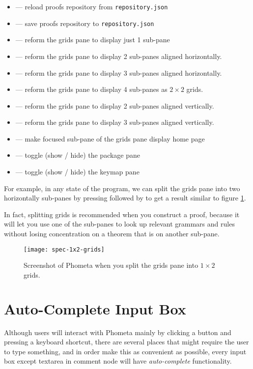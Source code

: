 \documentclass[master.tex]{subfiles}
\begin{document}
\begin{itemize}
\item {} --- reload proofs repository from \texttt{repository.json}
\item {} --- save proofs repository to \texttt{repository.json}
\item {} --- reform the grids pane to display just 1 sub-pane
\item {} --- reform the grids pane to display 2 sub-panes aligned
  horizontally.
\item {} --- reform the grids pane to display 3 sub-panes aligned
  horizontally.
\item {} --- reform the grids pane to display 4 sub-panes as $2 \times 2$
  grids.
\item {} --- reform the grids pane to display 2 sub-panes aligned
  vertically.
\item {} --- reform the grids pane to display 3 sub-panes aligned
  vertically.
\item {} --- make focused sub-pane of the grids pane display home page
\item {} --- toggle (show / hide) the package pane
\item {} --- toggle (show / hide) the keymap pane
\end{itemize}

For example, in any state of the program, we can split the grids pane into two
horizontally sub-panes by pressing  followed by  to get a
result similar to figure \ref{fig:specification-1x2-grids}.

In fact, splitting grids is recommended when you construct a proof, because it
will let you use one of the sub-panes to look up relevant grammars and rules
without losing concentration on a theorem that is on another sub-pane.

\begin{figure}[H]
    \centering
    \texttt{[image: spec-1x2-grids]}
    \caption{Screenshot of Phometa when you split the grids pane into $1 \times 2$
      grids.}
\label{fig:specification-1x2-grids}
\end{figure}

\section{Auto-Complete Input Box}
Although users will interact with Phometa mainly by clicking a button and
pressing a keyboard shortcut, there are several places that might require the
user to type something, and in order make this as convenient as possible, every
input box except textarea in comment node will have \emph{auto-complete}
functionality.
\end{document}
